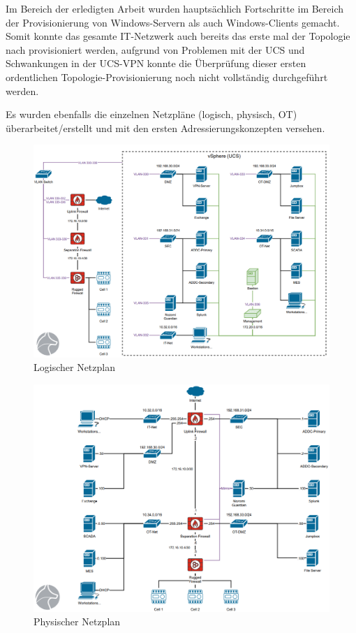 \documentclass[
	headings=optiontotocandhead,%
	oneside,
	numbers=noenddot,%
	toc=flat, %
	10pt, %
	parskip=full, %
	listof=totoc, %
	listof=flat, %
	numbers=noenddot, %
	bibliography=totoc, %
	a4paper,DIV=14,
]{scrartcl}
\begin{document}
Im Bereich der erledigten Arbeit wurden hauptsächlich Fortschritte im Bereich der Provisionierung von Windows-Servern als auch Windows-Clients gemacht. Somit konnte das gesamte IT-Netzwerk auch bereits das erste mal der Topologie nach provisioniert werden, aufgrund von Problemen mit der UCS und Schwankungen in der UCS-VPN konnte die Überprüfung dieser ersten ordentlichen Topologie-Provisionierung noch nicht vollständig durchgeführt werden.

Es wurden ebenfalls die einzelnen Netzpläne (logisch, physisch, OT) überarbeitet/erstellt und mit den ersten Adressierungskonzepten versehen.

\begin{figure}[h]
	\centering
	\includegraphics[width=0.9\linewidth]{20241008_1}
	\caption[]{Logischer Netzplan}
\end{figure}
\FloatBarrier 

\begin{figure}[h]
	\centering
	\includegraphics[width=0.9\linewidth]{20241008_2}
	\caption[]{Physischer Netzplan}
\end{figure}
\FloatBarrier 
\end{document}
